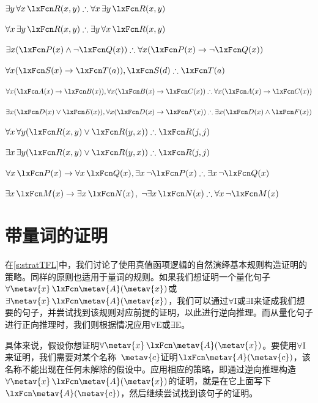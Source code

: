 \begin{compactlist}
\item $\exists y\,\forall x\,\atom{R}{x,y} \therefore \forall x\,\exists y\,\atom{R}{x,y}$
\item $\forall x\,\exists y\,\atom{R}{x,y} \therefore  \exists y\,\forall x\,\atom{R}{x,y}$
\item $\exists x(\atom{P}{x} \eand \enot \atom{Q}{x}) \therefore \forall x(\atom{P}{x} \eif \enot \atom{Q}{x})$
\item $\forall x(\atom{S}{x} \eif \atom{T}{a}), \atom{S}{d} \therefore \atom{T}{a}$
\item $\forall x(\atom{A}{x}\eif \atom{B}{x}), \forall x(\atom{B}{x} \eif \atom{C}{x}) \therefore \forall x(\atom{A}{x} \eif \atom{C}{x})$
\item $\exists x(\atom{D}{x} \eor \atom{E}{x}), \forall x(\atom{D}{x} \eif \atom{F}{x}) \therefore \exists x(\atom{D}{x} \eand \atom{F}{x})$
\item $\forall x\,\forall y(\atom{R}{x,y} \eor \atom{R}{y,x}) \therefore \atom{R}{j,j}$
\item $\exists x\,\exists y(\atom{R}{x,y} \eor \atom{R}{y,x}) \therefore \atom{R}{j,j}$
\item $\forall x\,\atom{P}{x} \eif \forall x\,\atom{Q}{x}, \exists x\, \enot\atom{P}{x} \therefore \exists x\, \enot \atom{Q}{x}$
\item $\exists x\,\atom{M}{x} \eif \exists x\,\atom{N}{x}$, $\enot \exists x\,\atom{N}{x}\therefore  \forall x\, \enot \atom{M}{x}$
\end{compactlist}

\chapter{带量词的证明}

在\cref{s:stratTFL}中，我们讨论了使用真值函项逻辑的自然演绎基本规则构造证明的策略。同样的原则也适用于量词的规则。如果我们想证明一个量化句子$\forall \metav{x}\,
\atom{\metav{A}}{\metav{x}}$或$\exists \metav{x}\,
\atom{\metav{A}}{\metav{x}}$，我们可以通过$\forall$I或$\exists$I来证成我们想要的句子，并尝试找到该规则对应前提的证明，以此进行逆向推理。而从量化句子进行正向推理时，我们则根据情况应用$\forall$E或$\exists$E。

具体来说，假设你想证明$\forall \metav{x}\, \atom{\metav{A}}{\metav{x}}$。要使用$\forall$I来证明，我们需要对某个名称~$\metav{c}$证明$\atom{\metav{A}}{\metav{c}}$，该名称不能出现在任何未解除的假设中。应用相应的策略，即通过逆向推理构造$\forall \metav{x}\, \atom{\metav{A}}{\metav{x}}$的证明，就是在它上面写下$\atom{\metav{A}}{\metav{c}}$，然后继续尝试找到该句子的证明。


